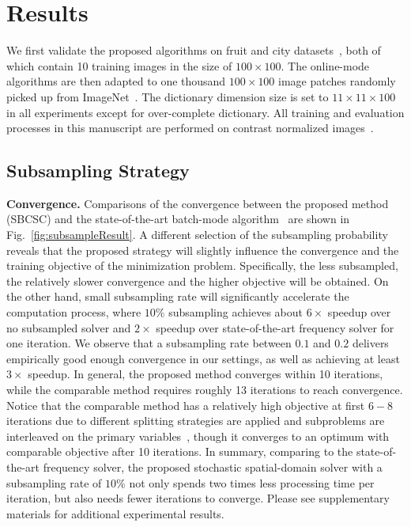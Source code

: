 \section{Results} \label{sec:result}
We first validate the proposed algorithms on fruit and city datasets~\cite{zeiler2010deconvolutional}, both of which contain 10 training images in the size of $100 \times 100$. The online-mode algorithms are then adapted to one thousand $100 \times 100$ image patches randomly picked up from ImageNet~\cite{deng2009imagenet}. The dictionary dimension size is set to $11 \times 11 \times 100$ in all experiments except for over-complete dictionary. All training and evaluation processes in this manuscript are performed on contrast normalized images~\cite{zeiler2010deconvolutional,heide2015fast}.

\subsection{Subsampling Strategy}

{\bfseries Convergence.} Comparisons of the convergence between the proposed method (SBCSC) and the state-of-the-art batch-mode algorithm~\cite{heide2015fast} are shown in Fig.\ \ref{fig:subsampleResult}. A different selection of the subsampling probability reveals that the proposed strategy will slightly influence the convergence and the training objective of the minimization problem. Specifically, the less subsampled, the relatively slower convergence and the higher objective will be obtained. On the other hand, small subsampling rate will significantly accelerate the computation process, where $10\%$ subsampling achieves about $6 \times$ speedup over no subsampled solver and $2 \times$ speedup over state-of-the-art frequency solver for one iteration. We observe that a subsampling rate between $0.1$ and $0.2$ delivers empirically good enough convergence in our settings, as well as achieving at least $3 \times$ speedup. In general, the proposed method converges within 10 iterations, while the comparable method requires roughly 13 iterations to reach convergence. Notice that the comparable method has a relatively high objective at first $6-8$ iterations due to different splitting strategies are applied and subproblems are interleaved on the primary variables~\cite{wohlberg2016efficient}, though it converges to an optimum with comparable objective after 10 iterations. In summary, comparing to the state-of-the-art frequency solver, the proposed stochastic spatial-domain solver with a subsampling rate of $10\%$ not only spends two times less processing time per iteration, but also needs fewer iterations to converge. Please see supplementary materials for additional experimental results.

